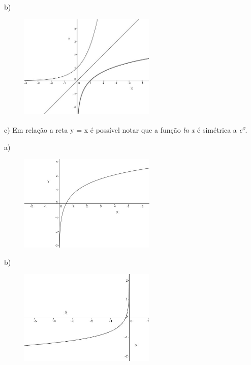 \begin{respostas}{7}
    b)

    \begin{figure}[H]
	    \begin{Center}
		    \includegraphics[width=2.55in,height=1.94in]{capitulos/logaritmos_e_funcao_logaritmica/media/image25.JPG}
        \end{Center}    
    \end{figure}

    c) Em relação a reta y = x é possível notar que a função \textit{ln x} é simétrica a \textit{e\textsuperscript{x}}. 

	\ansitem a)

\begin{figure}[H]
	\begin{Center}
		\includegraphics[width=2.56in,height=1.81in]{capitulos/logaritmos_e_funcao_logaritmica/media/image26.JPG}
	\end{Center}
\end{figure}

b)

\begin{figure}[H]
	\begin{Center}
		\includegraphics[width=2.56in,height=1.78in]{capitulos/logaritmos_e_funcao_logaritmica/media/image27.JPG}
	\end{Center}
\end{figure}


\end{respostas}

